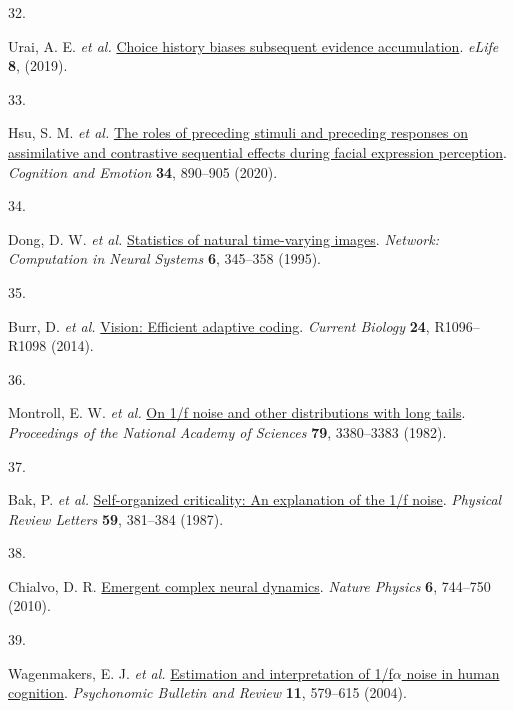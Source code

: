 \documentclass[
]{article}
\newlength{\cslhangindent}
\newlength{\csllabelwidth}
\newlength{\cslentryspacingunit} %
\newenvironment{CSLReferences}[2] %
 {%
  \setlength{\parindent}{0pt}
  \ifodd #1
  \let\oldpar\par
  \def\par{\hangindent=\cslhangindent\oldpar}
  \fi
  \setlength{\parskip}{#2\cslentryspacingunit}
 }%
 {}
\newcommand{\CSLLeftMargin}[1]{\parbox[t]{\csllabelwidth}{#1}}
\newcommand{\CSLRightInline}[1]{\parbox[t]{\linewidth - \csllabelwidth}{#1}\break}
\begin{document}
\begin{CSLReferences}{0}{0}
\leavevmode{}%
\CSLLeftMargin{32. }%
\CSLRightInline{Urai, A. E. \emph{et al.}
\href{https://doi.org/10.7554/eLife.46331}{{Choice history biases
subsequent evidence accumulation}}. \emph{eLife} \textbf{8}, (2019).}

\leavevmode{}%
\CSLLeftMargin{33. }%
\CSLRightInline{Hsu, S. M. \emph{et al.}
\href{https://doi.org/10.1080/02699931.2019.1696752}{{The roles of
preceding stimuli and preceding responses on assimilative and
contrastive sequential effects during facial expression perception}}.
\emph{Cognition and Emotion} \textbf{34}, 890--905 (2020).}

\leavevmode{}%
\CSLLeftMargin{34. }%
\CSLRightInline{Dong, D. W. \emph{et al.}
\href{https://doi.org/10.1088/0954-898X_6_3_003}{{Statistics of natural
time-varying images}}. \emph{Network: Computation in Neural Systems}
\textbf{6}, 345--358 (1995).}

\leavevmode{}%
\CSLLeftMargin{35. }%
\CSLRightInline{Burr, D. \emph{et al.}
\href{https://doi.org/10.1016/j.cub.2014.10.002}{{Vision: Efficient
adaptive coding}}. \emph{Current Biology} \textbf{24}, R1096--R1098
(2014).}

\leavevmode{}%
\CSLLeftMargin{36. }%
\CSLRightInline{Montroll, E. W. \emph{et al.}
\href{https://doi.org/10.1073/pnas.79.10.3380}{{On 1/f noise and other
distributions with long tails}}. \emph{Proceedings of the National
Academy of Sciences} \textbf{79}, 3380--3383 (1982).}

\leavevmode{}%
\CSLLeftMargin{37. }%
\CSLRightInline{Bak, P. \emph{et al.}
\href{https://doi.org/10.1103/PhysRevLett.59.381}{{Self-organized
criticality: An explanation of the 1/f noise}}. \emph{Physical Review
Letters} \textbf{59}, 381--384 (1987).}

\leavevmode{}%
\CSLLeftMargin{38. }%
\CSLRightInline{Chialvo, D. R.
\href{https://doi.org/10.1038/nphys1803}{{Emergent complex neural
dynamics}}. \emph{Nature Physics} \textbf{6}, 744--750 (2010).}

\leavevmode{}%
\CSLLeftMargin{39. }%
\CSLRightInline{Wagenmakers, E. J. \emph{et al.}
\href{https://doi.org/10.3758/BF03196615}{{Estimation and interpretation
of 1/f\(\alpha\) noise in human cognition}}. \emph{Psychonomic Bulletin
and Review} \textbf{11}, 579--615 (2004).}


\end{CSLReferences}
\end{document}
